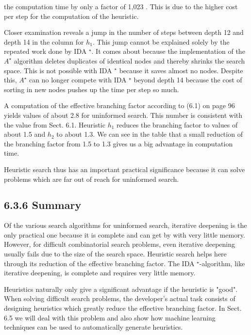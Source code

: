 \documentclass[10pt]{book}
\begin{document}
\begin{center}
the computation time by only a factor of 1,023 . This is due to the higher cost per step for the computation of the heuristic.


Closer examination reveals a jump in the number of steps between depth 12 and depth 14 in the column for $h_{1}$. This jump cannot be explained solely by the repeated work done by IDA ${ }^{\star}$. It comes about because the implementation of the $A^{\star}$ algorithm deletes duplicates of identical nodes and thereby shrinks the search space. This is not possible with IDA ${ }^{\star}$ because it saves almost no nodes. Despite this, $A^{\star}$ can no longer compete with IDA ${ }^{\star}$ beyond depth 14 because the cost of sorting in new nodes pushes up the time per step so much.

A computation of the effective branching factor according to (6.1) on page 96 yields values of about 2.8 for uninformed search. This number is consistent with the value from Sect. 6.1. Heuristic $h_{1}$ reduces the branching factor to values of about 1.5 and $h_{2}$ to about 1.3. We can see in the table that a small reduction of the branching factor from 1.5 to 1.3 gives us a big advantage in computation time.

Heuristic search thus has an important practical significance because it can solve problems which are far out of reach for uninformed search.

\subsection*{6.3.6 Summary}
Of the various search algorithms for uninformed search, iterative deepening is the only practical one because it is complete and can get by with very little memory. However, for difficult combinatorial search problems, even iterative deepening usually fails due to the size of the search space. Heuristic search helps here through its reduction of the effective branching factor. The IDA ${ }^{\star}$-algorithm, like iterative deepening, is complete and requires very little memory.

Heuristics naturally only give a significant advantage if the heuristic is "good". When solving difficult search problems, the developer's actual task consists of designing heuristics which greatly reduce the effective branching factor. In Sect. 6.5 we will deal with this problem and also show how machine learning techniques can be used to automatically generate heuristics.


\end{center}
\end{document}
